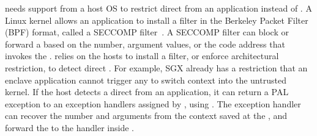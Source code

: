 \thelibos{} needs support from a host OS to restrict direct \linuxapis{} from an application instead of \libc{}.
A Linux kernel allows an application to install a \linuxapi{} filter in the Berkeley Packet Filter (BPF) format,
called a SECCOMP filter~\cite{seccomp}.
A SECCOMP filter can block or forward a \linuxapi{} based on the \linuxapi{} number,
argument values, or the code address that invokes the \linuxapi{}.
\graphene{} relies on the hosts to install a \linuxapi{} filter, or enforce architectural restriction, to detect direct \linuxapis{}.
For example, SGX already has a restriction that an enclave application cannot trigger any \linuxapi{} to switch context into the untrusted kernel.
If the host detects a direct \linuxapi{} from an application,
it can return
a PAL exception to an exception handlers assigned by \thelibos{}, using  .
The exception handler can recover the \linuxapi{} number and arguments
from the context saved at the \linuxapi{},
and forward the \linuxapi{} to the \linuxapi{} handler
inside \thelibos{}.


